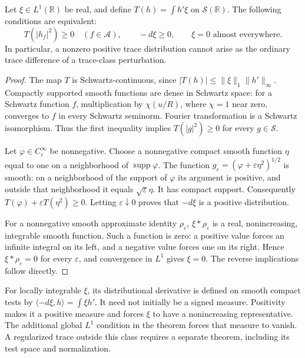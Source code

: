 \begin{theorem}
\label{v4-arith:w7-j:thm:ATP-iff-S-unitary}
Let \(\xi\in L^1(\mathbb R)\) be real, and define
\(T(h)=\int h'\xi\) on \(\mathscr S(\mathbb R)\).
The following conditions are equivalent:
\[
 T(|h_f|^2)\geq0\quad(f\in\mathscr A),
 \qquad -d\xi\geq0,
 \qquad \xi=0\text{ almost everywhere}.
\]
In particular, a nonzero positive trace distribution cannot arise
as the ordinary trace difference of a trace-class perturbation.
\end{theorem}
\begin{proof}
The map \(T\) is Schwartz-continuous, since
\(|T(h)|\leq\|\xi\|_1\|h'\|_\infty\).
Compactly supported smooth functions are dense in Schwartz space:
for a Schwartz function \(f\), multiplication by
\(\chi(u/R)\), where \(\chi=1\) near zero, converges to \(f\)
in every Schwartz seminorm. Fourier transformation is a Schwartz
isomorphism. Thus the first inequality implies
\(T(|g|^2)\geq0\) for every \(g\in\mathscr S\).

Let \(\varphi\in C_c^\infty\) be nonnegative. Choose a nonnegative
compact smooth function \(\eta\) equal to one on a neighborhood
of \(\operatorname{supp}\varphi\). The function
\(g_\varepsilon=(\varphi+\varepsilon\eta^2)^{1/2}\) is smooth:
on a neighborhood of the support of \(\varphi\) its argument is
positive, and outside that neighborhood it equals
\(\sqrt\varepsilon\eta\). It has compact support. Consequently
\(T(\varphi)+\varepsilon T(\eta^2)\geq0\).
Letting \(\varepsilon\downarrow0\) proves that \(-d\xi\) is a
positive distribution.

For a nonnegative smooth approximate identity \(\rho_\varepsilon\),
\(\xi*\rho_\varepsilon\) is a real, nonincreasing, integrable
smooth function. Such a function is zero: a positive value forces
an infinite integral on its left, and a negative value forces one
on its right. Hence \(\xi*\rho_\varepsilon=0\) for every
\(\varepsilon\), and convergence in \(L^1\) gives \(\xi=0\).
The reverse implications follow directly.
\end{proof}

\begin{remark}
\label{v4-arith:w7-j:rem:honest-caveat}
For locally integrable \(\xi\), its distributional derivative is
defined on smooth compact tests by
\(\langle-d\xi,h\rangle=\int\xi h'\).
It need not initially be a signed measure. Positivity makes it
a positive measure and forces \(\xi\) to have a nonincreasing
representative. The additional global \(L^1\) condition in the
theorem forces that measure to vanish. A regularized trace outside
this class requires a separate theorem, including its test space
and normalization.
\end{remark}

